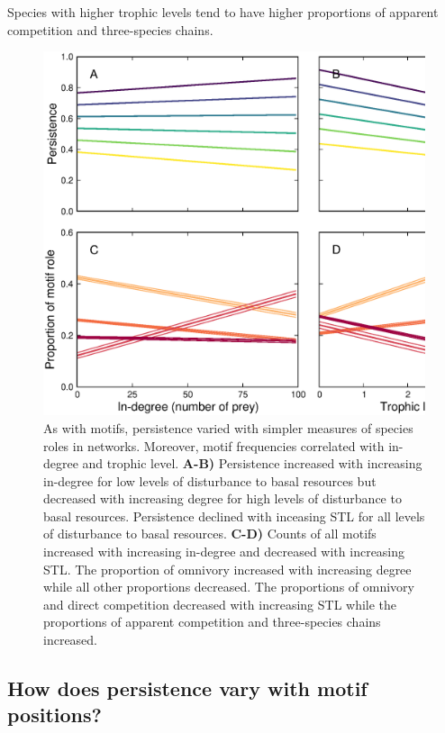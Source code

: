 \documentclass[12pt]{article}
\begin{document}
\begin{spacing}{2.0}
        Species with higher trophic levels tend to have higher proportions of apparent competition and three-species chains. 
        

            \begin{figure}
                \centering
                \includegraphics[width=\textwidth]{figures/roles_vs_TL.eps}
                \caption{As with motifs, persistence varied with simpler measures of species roles in networks. Moreover, motif frequencies correlated with in-degree and trophic level. \textbf{A-B)} Persistence increased with increasing in-degree for low levels of disturbance to basal resources but decreased with increasing degree for high levels of disturbance to basal resources.
                Persistence declined with inceasing STL for all levels of disturbance to basal resources.
                \textbf{C-D)} Counts of all motifs increased with increasing in-degree and decreased with increasing STL. The proportion of omnivory increased with increasing degree while all other proportions decreased. The proportions of omnivory and direct competition decreased with increasing STL while the proportions of apparent competition and three-species chains increased.}
                \label{fig:motifs_vs_TL_and_deg}
            \end{figure}


    \subsection*{How does persistence vary with motif positions?}


\end{spacing}
\end{document}

